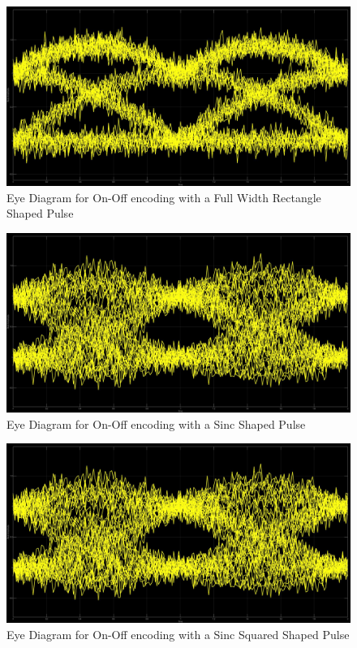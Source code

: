 \documentclass{article}
\begin{document}
\begin{figure}[H]
  \includegraphics[width = \linewidth]{OO_Sin_Eye.jpg}
  \caption{Eye Diagram for On-Off encoding with a Full Width Rectangle Shaped Pulse}
  \label{fig:OO-Sin-Eye}
\end{figure}
\begin{figure}[H]
  \includegraphics[width = \linewidth]{OO_Sinc_Eye.jpg}
  \caption{Eye Diagram for On-Off encoding with a Sinc Shaped Pulse}
  \label{fig:OO-Sinc-Eye}
\end{figure}
\begin{figure}[H]
  \includegraphics[width = \linewidth]{OO_Squared_Eye.jpg}
  \caption{Eye Diagram for On-Off encoding with a Sinc Squared Shaped Pulse}
  \label{fig:OO-Squared-Eye}
\end{figure}
\end{document}
